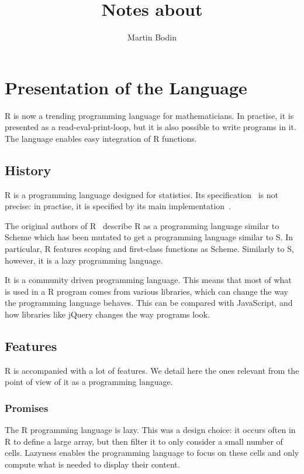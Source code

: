 \documentclass{article}
\title{Notes about \R}
\author{Martin Bodin}
\newcommand\R{R}
\newcommand\C{R}
\begin{document}
\maketitle

\section{Presentation of the Language}

\R{} is now a trending programming language for mathematicians.
In practise, it is presented as a read-eval-print-loop,
but it is also possible to write programs in it.
The language enables easy integration of \C{} functions.

\subsection{History}

\R{} is a programming language designed for statistics.
Its specification~\parencite{team2000r} is not precise:
in practise, it is specified by its main implementation~\parencite{Rwebsite}.

The original authors of \R{}~\parencite{ihaka1996r}
describe \R{} as a programming language similar to Scheme
which has been mutated to get a programming language similar to S.
In particular, \R{} features scoping and first-class functions
as Scheme.
Similarly to S, however, it is a lazy programming language.

It is a community driven programming language.
This means that most of what is used in a \R{} program comes from various libraries,
which can change the way the programming language behaves.
This can be compared with JavaScript,
and how libraries like jQuery changes the way programs look.

\subsection{Features}

\R{} is accompanied with a lot of features.
We detail here the ones relevant from the point of view
of it as a programming language.

\subsubsection{Promises}

The \R{} programming language is lazy.
This was a design choice:
it occurs often in \R{} to define a large array,
but then filter it to only consider a small number of cells.
Lazyness enables the programming language to focus on these cells
and only compute what is needed to display their content.
\end{document}
